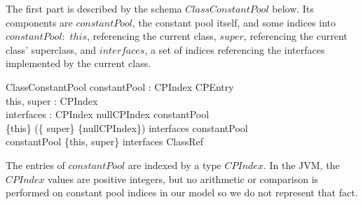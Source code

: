 The first part is described by the schema $ClassConstantPool$ below.
Its components are $constantPool$, the constant pool itself, and some
indices into $constantPool$:~$this$, referencing the current class,
$super$, referencing the current class' superclass, and $interfaces$,
a set of indices referencing the interfaces implemented by the
current class.
\begin{schema}{ClassConstantPool}
  constantPool : CPIndex \pfun CPEntry \\
  this, super : CPIndex \\
  interfaces : \finset CPIndex
\where
  nullCPIndex \notin \dom constantPool \\
  \{this\} \cup (\{ super\} \setminus \{nullCPIndex\}) \cup interfaces \subseteq \dom constantPool \\
  constantPool \limg \{this, super\} \cup interfaces \rimg \subseteq \ran ClassRef
\end{schema}
The entries of $constantPool$ are indexed by a type $CPIndex$.
In the JVM, the $CPIndex$ values are positive integers, but no
arithmetic or comparison is performed on constant pool indices in our
model so we do not represent that fact.

